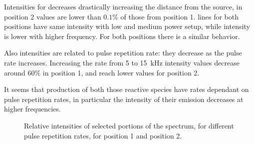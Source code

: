 Intensities for  decreases drastically increasing the distance from the source, in position 2 values are lower than $0.1\%$ of those from position 1.  lines for both positions have same intensity with low and medium power setup, while intensity is lower with higher frequency. For both positions there is a similar behavior.

Also  intensities are related to pulse repetition rate: they decrease as the pulse rate increases. Increasing the rate from \num{5} to \SI{15}{\kilo\hertz} intensity values decrease around $60\%$ in position 1, and reach lower values for position 2.

It seems that production of both those reactive species have rates dependant on pulse repetition rates, in particular the intensity of their emission decreases at higher frequencies.
\begin{figure}
\centering
 \hspace{0.55\textwidth}
 \hfill
 \caption{Relative intensities of selected portions of the spectrum, for different pulse repetition rates, for position 1 and position 2.}
 \label{fig:irel}
\end{figure}



